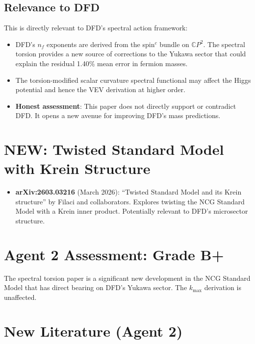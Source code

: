 \documentclass[11pt,a4paper]{article}
\newcommand{\NEW}{\textcolor{dfdblue}{\textbf{NEW}}}
\newcommand{\CP}{\mathbb{C}P}
\begin{document}
\subsection{Relevance to DFD}

This is directly relevant to DFD's spectral action framework:
\begin{itemize}
\item DFD's $n_f$ exponents are derived from the spin$^c$ bundle on $\CP^2$. The spectral torsion provides a new source of corrections to the Yukawa sector that could explain the residual 1.40\% mean error in fermion masses.
\item The torsion-modified scalar curvature spectral functional may affect the Higgs potential and hence the VEV derivation at higher order.
\item \textbf{Honest assessment}: This paper does not directly support or contradict DFD. It opens a new avenue for improving DFD's mass predictions.
\end{itemize}

\section{\NEW: Twisted Standard Model with Krein Structure}

\begin{itemize}
\item \textbf{arXiv:2603.03216} (March 2026): ``Twisted Standard Model and its Krein structure'' by Filaci and collaborators. Explores twisting the NCG Standard Model with a Krein inner product. Potentially relevant to DFD's microsector structure.
\end{itemize}

\section{Agent 2 Assessment: Grade B+}

The spectral torsion paper is a significant new development in the NCG Standard Model that has direct bearing on DFD's Yukawa sector. The $k_{\max}$ derivation is unaffected.

\section{New Literature (Agent 2)}
\end{document}
